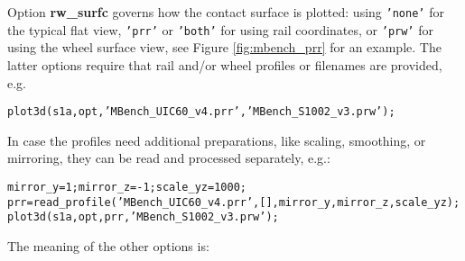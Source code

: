 \documentclass[12pt]{report}
\begin{document}
Option {\bf rw\_surfc} governs how the contact surface is plotted: using
{\tt 'none'} for the typical flat view, {\tt 'prr'} or {\tt 'both'} for
using rail coordinates, or {\tt 'prw'} for using the wheel surface view,
see Figure \ref{fig:mbench_prr} for an example. The latter options require
that rail and/or wheel profiles or filenames are provided, e.g.\
\begin{alltt}\small
  plot3d( s1a, opt, 'MBench_UIC60_v4.prr', 'MBench_S1002_v3.prw' );
\end{alltt}
In case the profiles need additional preparations, like scaling, smoothing,
or mirroring, they can be read and processed separately, e.g.:
\begin{alltt}\small
  mirror_y = 1; mirror_z = -1; scale_yz = 1000;
  prr = read_profile('MBench_UIC60_v4.prr', [], mirror_y, mirror_z, scale_yz);
  plot3d( s1a, opt, prr, 'MBench_S1002_v3.prw' );
\end{alltt}
The meaning of the other options is:
\end{document}
